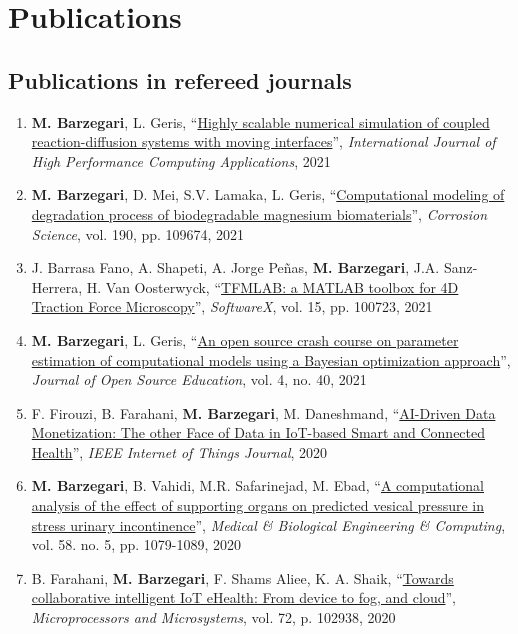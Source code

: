 \documentclass{cv}
\begin{document}

\section{Publications}

\subsection{Publications in refereed journals}
\begin{enumerate}
\item
\textbf{M. Barzegari}, L. Geris, ``\href{https://doi.org/10.1177/10943420211045939}{Highly scalable numerical simulation of coupled reaction-diffusion systems with moving interfaces}'', \textit{International Journal of High Performance Computing Applications}, 2021
\item
\textbf{M. Barzegari}, D. Mei, S.V. Lamaka, L. Geris, ``\href{https://doi.org/10.1016/j.corsci.2021.109674}{Computational modeling of degradation process of biodegradable magnesium biomaterials}'', \textit{Corrosion Science}, vol. 190, pp. 109674, 2021
\item
J. Barrasa Fano, A. Shapeti, A. Jorge Peñas, \textbf{M. Barzegari}, J.A. Sanz-Herrera, H. Van Oosterwyck, ``\href{https://doi.org/10.1016/j.softx.2021.100723}{TFMLAB: a MATLAB toolbox for 4D Traction Force Microscopy}'', \textit{SoftwareX}, vol. 15, pp. 100723, 2021 
\item
\textbf{M. Barzegari}, L. Geris, ``\href{https://doi.org/10.21105/jose.00089}{An open source crash course on parameter estimation of computational models using a Bayesian optimization approach}'', \textit{Journal of Open Source Education}, vol. 4, no. 40, 2021
\item
F. Firouzi, B. Farahani, \textbf{M. Barzegari}, M. Daneshmand, ``\href{https://doi.org/10.1109/JIOT.2020.3027971}{AI-Driven Data Monetization: The other Face of Data in IoT-based Smart and Connected Health}'', \textit{IEEE Internet of Things Journal}, 2020
\item
\textbf{M. Barzegari}, B. Vahidi, M.R. Safarinejad, M. Ebad, ``\href{https://doi.org/10.1007/s11517-020-02148-2}{A computational analysis of the effect of supporting organs on predicted vesical pressure in stress urinary incontinence}'', \textit{Medical \& Biological Engineering \& Computing}, vol. 58. no. 5, pp. 1079-1089, 2020
\item
B. Farahani, \textbf{M. Barzegari}, F. Shams Aliee, K. A. Shaik, “\href{https://doi.org/10.1016/j.micpro.2019.102938}{Towards collaborative intelligent IoT eHealth: From device to fog, and cloud}'', \textit{Microprocessors and Microsystems}, vol. 72, p. 102938, 2020

\end{enumerate}
\end{document}
